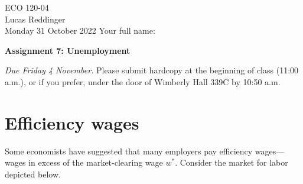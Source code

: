 \documentclass[
    letterpaper,paper=portrait,fleqn,
    DIV=16,fontsize=12pt,twoside=semi,
    parskip=full-,
    headings=standardclasses]
{scrartcl}
\begin{document}
\RaggedRight
\thispagestyle{plain}

ECO 120-04 \\
Lucas Reddinger \\
Monday 31 October 2022 \hfill Your full name: \underline{\hspace{3.25in}}

\vspace{0.7\baselineskip}
\textbf{\LARGE Assignment 7: Unemployment}
\vspace{0.3\baselineskip}

\emph{Due Friday 4 November.} Please submit hardcopy at the beginning of class (11:00 a.m.), or if you prefer, under the door of Wimberly Hall 339C by 10:50 a.m.

\section{Efficiency wages}

Some economists have suggested that many employers pay efficiency wages---wages in excess of the market-clearing wage $w^*$. Consider the market for labor depicted below. 

\begin{center}
\end{center}
\end{document}
